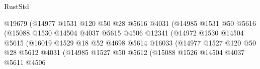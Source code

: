 \begin{lexlean}{RustStd}
\begin{coremodule}
                                          @19679
                                          (@14977
                                            @1531
                                            @120
                                            @50
                                            @28
                                            @5616
                                            @4031
                                            (@14985
                                              @1531
                                              @50
                                              @5616
                                              (@15088
                                                @1530
                                                @14504
                                                @4037
                                                @5615
                                                @4506
                                                @12341
                                                (@14972
                                                  @1530
                                                  @14504
                                                  @5615
                                                  (@16019
                                                    @1529
                                                    @18
                                                    @52
                                                    @4698
                                                    @5614
                                                    @16033
                                                    (@14977
                                                      @1527
                                                      @120
                                                      @50
                                                      @28
                                                      @5612
                                                      @4031
                                                      (@14985
                                                        @1527
                                                        @50
                                                        @5612
                                                        (@15088
                                                          @1526
                                                          @14504
                                                          @4037
                                                          @5611
                                                          @4506

\end{coremodule}
\end{lexlean}
